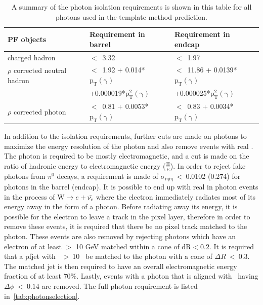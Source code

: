 \begin{table}[htb]
  \begin{center}
    \caption{
      \label{tab:photons}
      A summary of the photon isolation requirements is shown in this table for all photons used in the template method prediction.
    }
    \begin{tabular}{l|l|l}
      \hline
      \hline
      PF objects                      &Requirement in barrel                    &Requirement in endcap \\
      \hline
      charged hadron                  &$<$~3.32                                 &$<$~1.97                                    \\
      $\rho$ corrected neutral hadron &$<$~1.92 + 0.014*$\mathrm{p_{T}(\gamma)}$ &$<$~11.86 + 0.0139*$\mathrm{p_{T}(\gamma)}$ \\
                                      &+0.000019*$\mathrm{p_{T}^{2}(\gamma)}$     &+0.000025*$\mathrm{p_{T}^{2}(\gamma)}$       \\
      $\rho$ corrected photon         &$<$~0.81 + 0.0053*$\mathrm{p_{T}(\gamma)}$&$<$~0.83 + 0.0034*$\mathrm{p_{T}(\gamma)}$  \\
      \hline
      \hline      
    \end{tabular}
  \end{center}
\end{table}

In addition to the isolation requirements, further cuts are made on photons to maximize the energy resolution of the photon and also remove events with real \MET.
The photon is required to be mostly electromagnetic, and a cut is made on the ratio of hadronic energy to electromagnetic energy ($\mathrm{\frac{H}{E}}$).
In order to reject fake photons from $\pi^{0}$ decays, a requirement is made of $\mathrm{\sigma_{i\eta i\eta}~<~}$0.0102 (0.274) for photons in the barrel (endcap).
It is possible to end up with real \MET in photon events in the process of W$\rightarrow e+\mathrm{\bar{\nu_{e}}}$
where the electron immediately radiates most of its energy away in the form of a photon.
Before radiating away its energy, it is possible for the electron to leave a track in the pixel layer,
therefore in order to remove these events, it is required that there be no pixel track matched to the photon.
These events are also removed by rejecting photons which have an electron of at least \pt $>$ 10 GeV matched within a cone of $\mathrm{dR} < 0.2$.
It is required that a pfjet with \pt\ $>~$10 \gev\ be matched to the photon with a cone of $\Delta R~<~0.3$. 
The matched jet is then required to have an overall electromagnetic energy fraction of at least 70\%.
Lastly, events with a photon that is aligned with \MET\ having $\Delta\phi~<~0.14$ are removed. 
The full photon requirement is listed in~\ref{tab:photonselection}.

